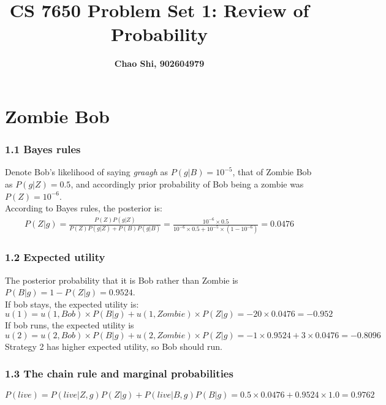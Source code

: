 \documentclass[twoside,10pt]{article}
\begin{document}
\title{\textbf{CS 7650 Problem Set 1: Review of Probability}}
\author{\textbf{Chao Shi, 902604979}}
\maketitle


\section{Zombie Bob}

\subsubsection*{1.1 Bayes rules}
Denote Bob's likelihood of saying \textit{graagh} as $P(g|B) = 10^{-5}$,
that of Zombie Bob as $P(g|Z) = 0.5$, and accordingly prior probability of Bob
being a zombie was $P(Z) = 10^{-6}$.\\
According to Bayes rules, the posterior is:
\begin{align}
    P(Z|g) = \frac{P(Z)P(g|Z)}{P(Z)P(g|Z) + P(B)P(g|B)} =
    \frac{10^{-6}\times0.5}{10^{-6}\times0.5+10^{-5}\times(1-10^{-6})} =  0.0476
\end{align}

\subsubsection*{1.2 Expected utility}
The posterior probability that it is Bob rather than Zombie is $P(B|g) = 1 - P(Z|g) =
0.9524$. \\
If bob stays, the expected utility is:
\begin{equation}
  u(1) = u(1,Bob)\times P(B|g) + u(1, Zombie)\times P(Z|g) = -20\times0.0476 =
  -0.952 
\end{equation}
If bob runs, the expected utility is
\begin{equation}
  u(2) = u(2,Bob)\times P(B|g) + u(2, Zombie)\times P(Z|g) =
  -1\times0.9524+3\times0.0476 = -0.8096
\end{equation}
Strategy 2 has higher expected utility, so Bob should run.

\subsubsection*{1.3 The chain rule and marginal probabilities}
\begin{equation}
  P(live) = P(live|Z,g)P(Z|g) + P(live|B,g)P(B|g) = 0.5\times0.0476 + 0.9524
  \times1.0 = 0.9762
\end{equation}
\vspace{1cm}
\end{document}
